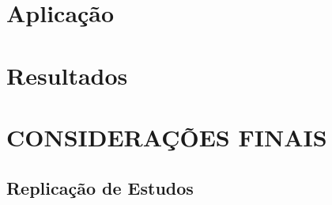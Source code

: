 \documentclass[12pt,openright,oneside,a4paper,chapter=TITLE,section=TITLE,subsection=TITLE,english,french,spanish,portugues,sumario=tradicional]{04-class-files/abntex2}
\begin{document}
\chapter{Aplicação}

\chapter{Resultados}


\chapter*[Conclusão]{CONSIDERAÇÕES FINAIS}

\postextual


\postextual


{\begin{apendicesenv}

\renewcommand{\thechapter}{\arabic{chapter}}

\chapter{Replicação de Estudos}
\section{}
 
\end{apendicesenv}
}{}



\printbibliography
\end{document}
